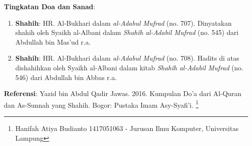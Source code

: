\documentclass[a4paper,12pt]{article}
\begin{document}
\par
\noindent
\textbf{Tingkatan Doa dan Sanad}:
\begin{enumerate}
\item \textbf{Shahih}: HR. Al-Bukhari dalam \textit{al-Adabul Mufrad} (no. 
707). Dinyatakan shahih oleh Syaikh al-Albani dalam \textit{Shah\^{i}h 
al-Adabil Mufrad} (no. 545) dari Abdullah bin Mas'ud r.a.
\item \textbf{Shahih}: HR. Al-Bukhari dalam \textit{al-Adabul Mufrad} (no. 
708). Hadits di atas dishahihkan oleh Syaikh al-Albani dalam kitab 
\textit{Shah\^{i}h al-Adabil Mufrad} (no. 546) dari Abdullah bin Abbas r.a.
\end{enumerate}
\textbf{Referensi}: Yazid bin Abdul Qadir Jawas. 2016. Kumpulan Do'a dari
Al-Quran dan As-Sunnah yang Shahih. Bogor: Pustaka Imam Asy-Syafi'i.
\footnote{Hanifah Atiya Budianto 1417051063 - Jurusan Ilmu Komputer,
Universitas Lampung}
\end{document}
